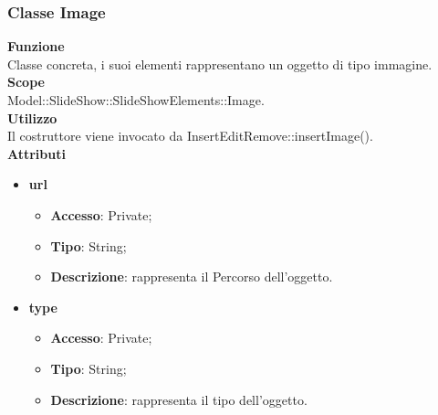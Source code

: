 {	\subsubsection{Classe Image}{
		\label{Image}
		\textbf{Funzione}\\
			\indent Classe concreta, i suoi elementi rappresentano un oggetto di tipo immagine.\\
	   	\textbf{Scope}\\
			\indent Model::SlideShow::SlideShowElements::Image.\\
		\textbf{Utilizzo}\\
			\indent Il costruttore viene invocato da InsertEditRemove::insertImage().\\
		\textbf{Attributi}
		\begin{itemize}
				\item \textbf{url}
				\begin{itemize}
					\item \textbf{Accesso}: Private;
					\item \textbf{Tipo}: String;
					\item \textbf{Descrizione}: rappresenta il Percorso dell’oggetto.
				\end{itemize}
				\item \textbf{type}
				\begin{itemize}
					\item \textbf{Accesso}: Private;
					\item \textbf{Tipo}: String;
					\item \textbf{Descrizione}: rappresenta il tipo dell'oggetto.
				\end{itemize}
		\end{itemize}
		}
		
}

